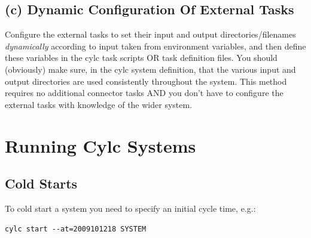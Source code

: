 \documentclass[11pt,a4paper]{article}
\begin{document}
\subsection{(c) Dynamic Configuration Of External Tasks}

Configure the external tasks to set their input and output
directories/filenames {\em dynamically} according to input taken from
environment variables, and then define these variables 
in the cylc task scripts OR task definition files. You should
(obviously) make sure, in the cylc system definition, that the various 
input and output directories are used consistently throughout the system. 
This method requires no additional connector tasks AND you don't have to
configure the external tasks with knowledge of the wider system. 

%




\section{Running Cylc Systems}
\label{RunningCylcSystems}

\subsection{Cold Starts}

To cold start a system you need to specify an initial cycle time, e.g.:

\begin{lstlisting}
cylc start --at=2009101218 SYSTEM
\end{lstlisting}
\end{document}
